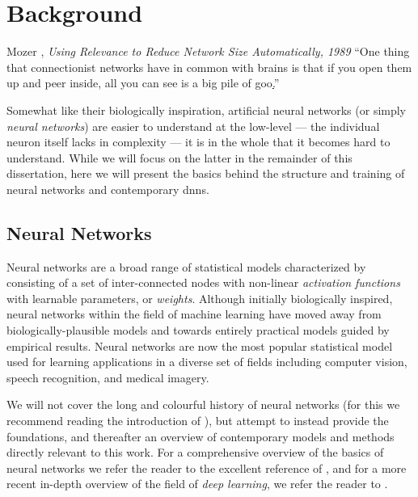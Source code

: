 \documentclass[thesis]{subfiles}
\begin{document}
\chapter{Background}\label{background}
\begin{chapquote}{Mozer \etal, \textit{Using Relevance to Reduce Network Size Automatically, 1989}}
    ``One thing that connectionist networks have in common with brains is that if you open them up and peer inside, all you can see is a big pile of goo\href{https://yani.io/thesiseasteregg.html}{.}''
\end{chapquote}
Somewhat like their biologically inspiration, artificial neural networks (or simply \emph{neural networks}) are easier to understand at the low-level --- the individual neuron itself lacks in complexity --- it is in the whole that it becomes hard to understand. While we will focus on the latter in the remainder of this dissertation, here we will present the basics behind the structure and training of neural networks and contemporary \glspl{dnn}.

\section{Neural Networks}
Neural networks are a broad range of statistical models characterized by consisting of a set of inter-connected nodes with non-linear \emph{activation functions} with learnable parameters, or \emph{weights}.
 Although initially biologically inspired, neural networks within the field of machine learning have moved away from biologically-plausible models and towards entirely practical models guided by empirical results. Neural networks are now the most popular statistical model used for learning applications in a diverse set of fields including computer vision, speech recognition, and medical imagery. 

We will not cover the long and colourful history of neural networks (for this we recommend reading the introduction of \citet{goodfellow2016deep}), but attempt to instead provide the foundations, and thereafter an overview of contemporary models and methods directly relevant to this work. For a comprehensive overview of the basics of neural networks we refer the reader to the excellent reference of \citet{Bishop1995}, and for a more recent  in-depth overview of the field of \emph{deep learning}, we refer the reader to \citet{goodfellow2016deep}. 
\end{document}
